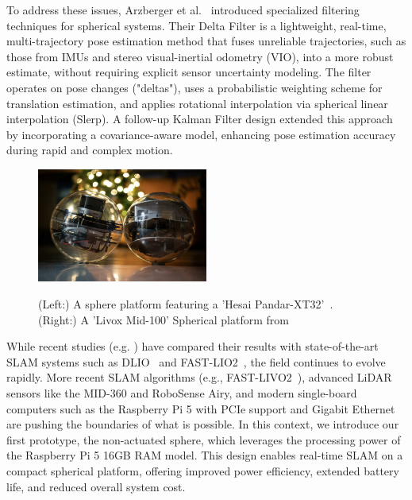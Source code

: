 \documentclass[english, bachelor, utf8]{base/thesis_telematics}
\begin{document}
To address these issues, Arzberger et al.~\cite{Kalman_filter_sphere,sphere_Fabi_1,DeltaFilter} introduced specialized filtering techniques for spherical systems. 
Their Delta Filter is a lightweight, real-time, multi-trajectory pose estimation method that fuses unreliable trajectories, such as those from IMUs and stereo visual-inertial odometry (VIO), into a more robust estimate, without requiring explicit sensor uncertainty modeling. 
The filter operates on pose changes ("deltas"), uses a probabilistic weighting scheme for translation estimation, and applies rotational interpolation via spherical linear interpolation (Slerp). 
A follow-up Kalman Filter design extended this approach by incorporating a covariance-aware model, enhancing pose estimation accuracy during rapid and complex motion.

\begin{figure}[h]
    \centering
    \includegraphics[width=0.5\textwidth]{pics/delta_kalman_robots.jpg}
    \label{fig:delta_kalman_robots}
    \caption{(Left:) A sphere platform featuring a 'Hesai Pandar-XT32'~\cite{Kalman_filter_sphere}. (Right:) A 'Livox Mid-100' Spherical platform from ~\cite{DeltaFilter}}
\end{figure}

While recent studies (e.g. \cite{Kalman_filter_sphere}) have compared their results with state-of-the-art SLAM systems such as DLIO~\cite{dlio} and FAST-LIO2~\cite{fastlio2}, the field continues to evolve rapidly. 
More recent SLAM algorithms (e.g., FAST-LIVO2~\cite{fastlivo2}), advanced LiDAR sensors like the MID-360 and RoboSense Airy, and modern single-board computers such as the Raspberry Pi 5 with PCIe support and Gigabit Ethernet are pushing the boundaries of what is possible. 
In this context, we introduce our first prototype, the non-actuated sphere, which leverages the processing power of the Raspberry Pi 5 16GB RAM model. 
This design enables real-time SLAM on a compact spherical platform, offering improved power efficiency, extended battery life, and reduced overall system cost.
\end{document}
